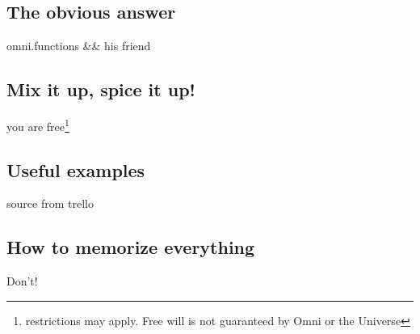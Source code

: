 \subsection{The obvious answer}
omni.functions \&\& his friend 
\subsection{Mix it up, spice it up!}
you are free\footnote{restrictions may apply. Free will is not guaranteed by Omni or the Universe}
\subsection{Useful examples}
source from trello
\subsection{How to memorize everything}
Don't!

